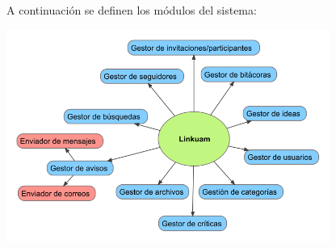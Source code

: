 \documentclass[11pt,letterpaper,titlepage]{article}
\begin{document}



A continuaci\'on se definen los m\'odulos del sistema:
\begin{center} 
\includegraphics[width=300pt]{arq1.png}
\end{center}
\end{document}
